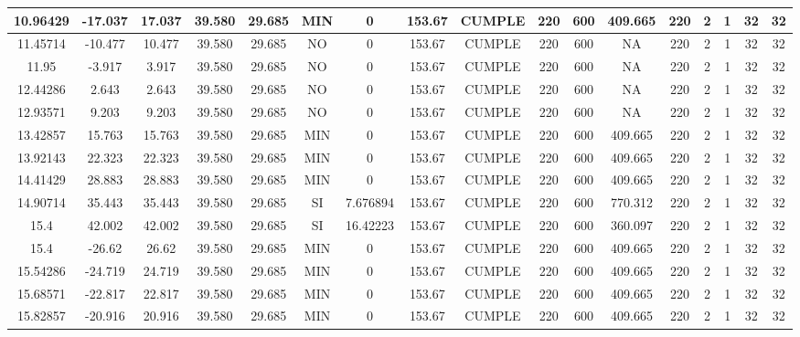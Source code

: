 \begin{table}[H]
{\begin{tabular}{|c|c|c|c|c|c|c|c|c|c|c|c|c|c|c|c|c|}
    \hline
    10.96429 & -17.037 & 17.037 & 39.580 & 29.685 & MIN & 0   & 153.67 & CUMPLE & 220 & 600 & 409.665 & 220 & 2   & 1   & 32  & 32 \bigstrut\\
    \hline
    11.45714 & -10.477 & 10.477 & 39.580 & 29.685 & NO  & 0   & 153.67 & CUMPLE & 220 & 600 & NA  & 220 & 2   & 1   & 32  & 32 \bigstrut\\
    \hline
    11.95 & -3.917 & 3.917 & 39.580 & 29.685 & NO  & 0   & 153.67 & CUMPLE & 220 & 600 & NA  & 220 & 2   & 1   & 32  & 32 \bigstrut\\
    \hline
    12.44286 & 2.643 & 2.643 & 39.580 & 29.685 & NO  & 0   & 153.67 & CUMPLE & 220 & 600 & NA  & 220 & 2   & 1   & 32  & 32 \bigstrut\\
    \hline
    12.93571 & 9.203 & 9.203 & 39.580 & 29.685 & NO  & 0   & 153.67 & CUMPLE & 220 & 600 & NA  & 220 & 2   & 1   & 32  & 32 \bigstrut\\
    \hline
    13.42857 & 15.763 & 15.763 & 39.580 & 29.685 & MIN & 0   & 153.67 & CUMPLE & 220 & 600 & 409.665 & 220 & 2   & 1   & 32  & 32 \bigstrut\\
    \hline
    13.92143 & 22.323 & 22.323 & 39.580 & 29.685 & MIN & 0   & 153.67 & CUMPLE & 220 & 600 & 409.665 & 220 & 2   & 1   & 32  & 32 \bigstrut\\
    \hline
    14.41429 & 28.883 & 28.883 & 39.580 & 29.685 & MIN & 0   & 153.67 & CUMPLE & 220 & 600 & 409.665 & 220 & 2   & 1   & 32  & 32 \bigstrut\\
    \hline
    14.90714 & 35.443 & 35.443 & 39.580 & 29.685 & SI  & 7.676894 & 153.67 & CUMPLE & 220 & 600 & 770.312 & 220 & 2   & 1   & 32  & 32 \bigstrut\\
    \hline
    15.4 & 42.002 & 42.002 & 39.580 & 29.685 & SI  & 16.42223 & 153.67 & CUMPLE & 220 & 600 & 360.097 & 220 & 2   & 1   & 32  & 32 \bigstrut\\
    \hline
    15.4 & -26.62 & 26.62 & 39.580 & 29.685 & MIN & 0   & 153.67 & CUMPLE & 220 & 600 & 409.665 & 220 & 2   & 1   & 32  & 32 \bigstrut\\
    \hline
    15.54286 & -24.719 & 24.719 & 39.580 & 29.685 & MIN & 0   & 153.67 & CUMPLE & 220 & 600 & 409.665 & 220 & 2   & 1   & 32  & 32 \bigstrut\\
    \hline
    15.68571 & -22.817 & 22.817 & 39.580 & 29.685 & MIN & 0   & 153.67 & CUMPLE & 220 & 600 & 409.665 & 220 & 2   & 1   & 32  & 32 \bigstrut\\
    \hline
    15.82857 & -20.916 & 20.916 & 39.580 & 29.685 & MIN & 0   & 153.67 & CUMPLE & 220 & 600 & 409.665 & 220 & 2   & 1   & 32  & 32 \bigstrut\\

\end{tabular}}
\end{table}
